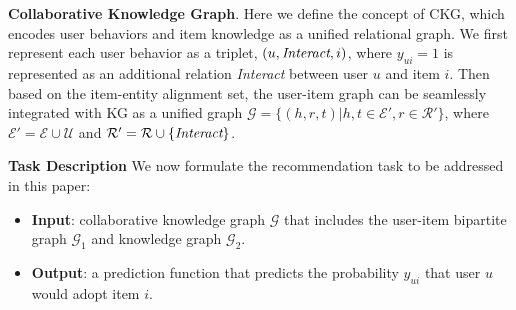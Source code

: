 \documentclass[sigconf]{acmart}
\newcommand{\Set}[1]{\mathcal{#1}}
\theoremstyle{definition}
\begin{document}
\vspace{5px}
\noindent\textbf{Collaborative Knowledge Graph}.
Here we define the concept of CKG, which encodes user behaviors and item knowledge as a unified relational graph.
We first represent each user behavior as a triplet, $(u,\emph{Interact},i)$, where $y_{ui}=1$ is represented as an additional relation \emph{Interact} between user $u$ and item $i$.
Then based on the item-entity alignment set, the user-item graph can be seamlessly integrated with KG as a unified graph $\Set{G}=\{(h,r,t)|h,t\in\Set{E}',r\in\Set{R}'\}$, where $\Set{E}'=\Set{E}\cup\Set{U}$ and $\Set{R}'=\Set{R}\cup\{\emph{Interact}\}$.

\vspace{5px}
\noindent\textbf{Task Description}
We now formulate the recommendation task to be addressed in this paper:
\begin{itemize}[leftmargin=*]
    \item \textbf{Input}: collaborative knowledge graph $\Set{G}$ that includes the user-item bipartite graph $\Set{G}_1$ and knowledge graph $\Set{G}_2$.
    \item \textbf{Output}: a prediction function that predicts the probability $\hat{y}_{ui}$ that user $u$ would adopt item $i$.
\end{itemize}
\end{document}

